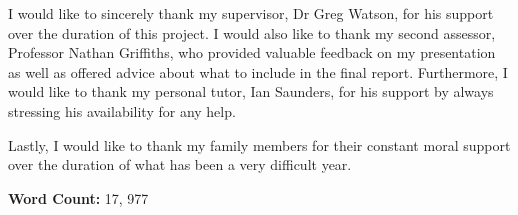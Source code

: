 \documentclass[12pt, a4paper]{article}
\newcommand{\np}
    {
    \vskip 0.4cm
    }
\begin{document}
I would like to sincerely thank my supervisor, Dr Greg Watson, for his support over the duration of this project. I would also like to thank my second assessor, Professor Nathan Griffiths, who provided valuable feedback on my presentation as well as offered advice about what to include in the final report. Furthermore, I would like to thank my personal tutor, Ian Saunders, for his support by always stressing his availability for any help.
\np
Lastly, I would like to thank my family members for their constant moral support over the duration of what has been a very difficult year.



\clearpage


\tableofcontents

\clearpage

\listoffigures

\listoftables
\np
\np
\np
\np
\np
\np
\np
\np
\np
\np
\np
\np
\np
\np
\np
\np
\np
\np
\np
\np
\np
\np
\np
\np
\textbf{Word Count:} 17, 977

\clearpage


\pagestyle{fancy}		%



\end{document}
